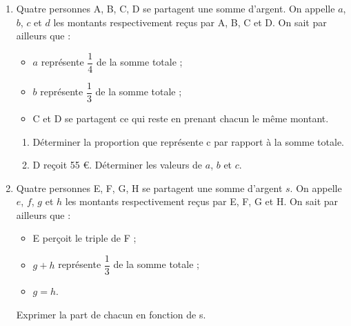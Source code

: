 \begin{enumerate}
    \setlength{\itemsep}{-1mm}
    \item Quatre personnes A, B, C, D se partagent une somme d’argent. On appelle $a$, $b$, $c$ et $d$ les montants respectivement reçus par A, B, C et D. On sait par ailleurs que :
       \begin{itemize}
          \item $a$ représente $\dfrac14$ de la somme totale ;
          \item $b$ représente $\dfrac13$ de la somme totale ;
          \item C et D se partagent ce qui reste en prenant chacun le même montant.
       \end{itemize}
       \begin{enumerate}
          \item Déterminer la proportion que représente c par rapport à la somme totale.
          \item D reçoit 55 \euro. Déterminer les valeurs de $a$, $b$ et $c$.
       \end{enumerate}
    \item Quatre personnes E, F, G, H se partagent une somme d’argent $s$. On appelle $e$, $f$, $g$ et $h$ les montants respectivement reçus par E, F, G et H. On sait par ailleurs que :
       \begin{itemize}
          \item E perçoit le triple de F ;
          \item $g+h$ représente $\dfrac13$ de la somme totale ;
          \item $g =h$.
       \end{itemize}
       Exprimer la part de chacun en fonction de s.
 \end{enumerate}